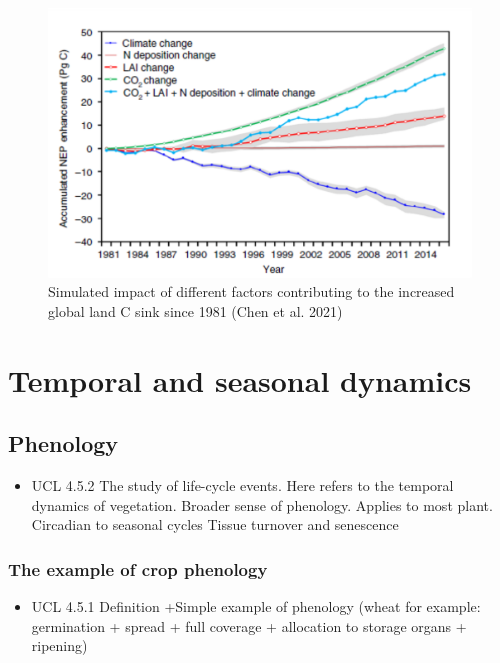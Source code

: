 \documentclass[
  oneside]{book}
\providecommand{\tightlist}{%
  \setlength{\itemsep}{0pt}\setlength{\parskip}{0pt}}
\begin{document}
\begin{figure}

{\centering \includegraphics[width=0.8\linewidth]{figures/chap3/f335_chen2} 

}

\caption{Simulated impact of different factors contributing to the increased global land C sink since 1981 (Chen et al. 2021) }\label{fig:f335}
\end{figure}

\hypertarget{temporal-and-seasonal-dynamics}{%
\chapter{Temporal and seasonal dynamics}\label{temporal-and-seasonal-dynamics}}


\hypertarget{phenology}{%
\section{Phenology}\label{phenology}}

\begin{itemize}
\tightlist
\item
  UCL 4.5.2
  The study of life-cycle events. Here refers to the temporal dynamics of vegetation.
  Broader sense of phenology.
  Applies to most plant. Circadian to seasonal cycles
  Tissue turnover and senescence
\end{itemize}

\hypertarget{the-example-of-crop-phenology}{%
\subsection{The example of crop phenology}\label{the-example-of-crop-phenology}}

\begin{itemize}
\tightlist
\item
  UCL 4.5.1
  Definition +Simple example of phenology (wheat for example: germination + spread + full coverage + allocation to storage organs + ripening)
\end{itemize}
\end{document}
